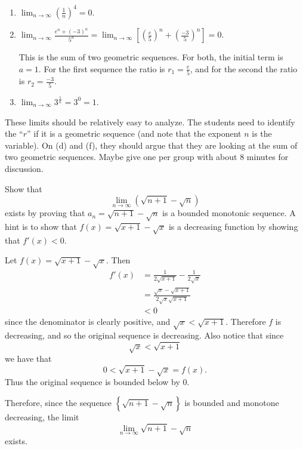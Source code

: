 \documentclass[noinstructornotes]{ximera}
\begin{document}
\begin{problem}
\begin{freeResponse}
\begin{enumerate}
	\item  $\lim_{n \to \infty} \left( \frac{1}{n} \right)^4 = 0$.  
	
	\item  $\lim_{n \to \infty} \frac{e^n + (-3)^n}{5^n} = \lim_{n \to \infty} \left[ \left( \frac{e}{5} \right)^n + \left( \frac{-3}{5} \right)^n \right] = 0.$  
	
	This is the sum of two geometric sequences.  
	For both, the initial term is $a = 1$.  
	For the first sequence the ratio is $r_1 = \frac{e}{5}$, and for the second the ratio is $r_2 = \frac{-3}{5}$.
	
	\item  $\lim_{n \to \infty} 3^\frac{1}{n} = 3^0 = 1$.  
	
	\end{enumerate}
	\end{freeResponse}

\end{problem}

\begin{instructorNotes}
These limits should be relatively easy to analyze.  
The students need to identify the ``$r$'' if it is a geometric sequence (and note that the exponent $n$ is the variable).  
On (d) and (f), they should argue that they are looking at the sum of two geometric sequences.  
Maybe give one per group with about $8$ minutes for discussion.  
\end{instructorNotes}







\begin{problem}
Show that 
$$\lim_{n \to \infty} \left( \sqrt{n+1} - \sqrt{n} \right)$$ 
exists by proving that $a_n = \sqrt{n+1} - \sqrt{n}$ is a bounded monotonic sequence.  A hint is to show that $f(x) = \sqrt{x+1} - \sqrt{x}$ is a decreasing function by showing that $f'(x) < 0$.  
	\begin{freeResponse}
	Let $f(x) = \sqrt{x+1} - \sqrt{x}$.  Then
		\begin{align*}
		f'(x) 
		&= \frac{1}{2 \sqrt{x+1}} - \frac{1}{2 \sqrt{x}}  \\
		&= \frac{\sqrt{x} - \sqrt{x+1}}{2 \sqrt{x}\sqrt{x+1}}  \\
		&< 0
		\end{align*}
	since the denominator is clearly positive, and $\sqrt{x} < \sqrt{x+1}$.
	Therefore $f$ is decreasing, and so the original sequence is decreasing.  
	Also notice that since 
	$$\sqrt{x} < \sqrt{x+1}$$
	we have that 
	$$0 < \sqrt{x+1} - \sqrt{x} = f(x).$$
	Thus the original sequence is bounded below by $0$.  \

	Therefore, since the sequence $\left\{ \sqrt{n+1} - \sqrt{n} \right\}$ is bounded and monotone decreasing, the limit
		\[
		\lim_{n \to \infty} \sqrt{n+1} - \sqrt{n}
		\]
	exists.
	\end{freeResponse}
		
\end{problem}
\end{document}
